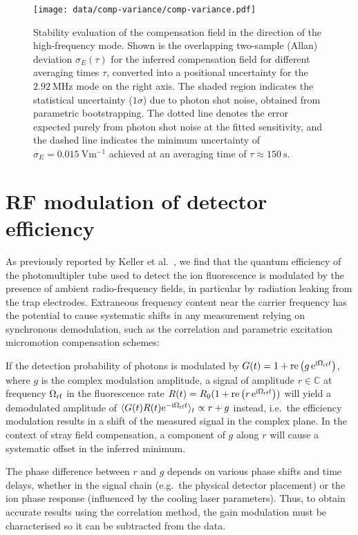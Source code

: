 \documentclass[pra,twocolumn]{revtex4-2}
\begin{document}
\begin{figure}
	\texttt{[image: data/comp-variance/comp-variance.pdf]}
	\caption{
		Stability evaluation of the compensation field in the direction of the high-frequency mode. Shown is the overlapping two-sample (Allan) deviation $\sigma_E(\tau)$ for the inferred compensation field for different averaging times $\tau$, converted into a positional uncertainty for the $\SI{2.92}{\mega\hertz}$ \srplus{} mode on the right axis. The shaded region indicates the statistical uncertainty ($1 \sigma$) due to photon shot noise, obtained from parametric bootstrapping. The dotted line denotes the error expected purely from photon shot noise at the fitted sensitivity, and the dashed line indicates the minimum uncertainty of $\sigma_E = \SI{0.015}{\volt \metre^{-1}}$ achieved at an averaging time of $\tau \approx \SI{150}{\second}$.}
	\label{fig:comp-variance}
\end{figure}


\section{RF modulation of detector efficiency}
\label{sec:pmt-gain-systematics}

As previously reported by Keller et al.~\cite{kellerPreciseDeterminationMicromotion2015}, we find that the quantum efficiency of the photomultipler tube used to detect the ion fluorescence is modulated by the presence of ambient radio-frequency fields, in particular by radiation leaking from the trap electrodes.
Extraneous frequency content near the carrier frequency has the potential to cause systematic shifts in any measurement relying on synchronous demodulation, such as the \RF{} correlation and parametric excitation micromotion compensation schemes:

If the detection probability of photons is modulated by $G(t) = 1 + \operatorname{re}\left(g\, \mathrm{e}^{\mathrm{i} \Omega_{\textrm{rf}} t}\right)$, where $g$ is the complex modulation amplitude, a signal of amplitude $r \in \mathbb{C}$ at frequency $\Omega_{\textrm{rf}}$ in the fluorescence rate  $R(t) = R_0 (1 + \operatorname{re}\left(r \, \mathrm{e}^{\mathrm{i} \Omega_{\textrm{rf}} t}\right))$ will yield a demodulated amplitude of  $\langle G(t) R(t) \mathrm{e}^{-\mathrm{i} \Omega_{\textrm{rf}} t}\rangle_t \propto r + g$ instead, i.e.~the efficiency modulation results in a shift of the measured signal in the complex plane.
In the context of stray field compensation, a component of $g$ along $r$ will cause a systematic offset in the inferred minimum.

The phase difference between $r$ and $g$ depends on various phase shifts and time delays, whether in the \RF{} signal chain (e.g.~the physical detector placement) or the ion phase response (influenced by the cooling laser parameters).
Thus, to obtain accurate results using the \RF{} correlation method, the gain modulation must be characterised so it can be subtracted from the data.
\end{document}
